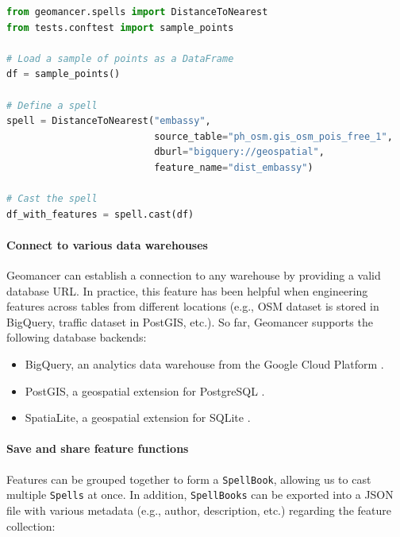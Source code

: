 \documentclass{article}
\begin{document}
\begin{lstlisting}[language=Python]
from geomancer.spells import DistanceToNearest
from tests.conftest import sample_points

# Load a sample of points as a DataFrame
df = sample_points()

# Define a spell
spell = DistanceToNearest("embassy",
                          source_table="ph_osm.gis_osm_pois_free_1",
                          dburl="bigquery://geospatial",
                          feature_name="dist_embassy")

# Cast the spell
df_with_features = spell.cast(df)
\end{lstlisting}

\paragraph{Connect to various data warehouses}
Geomancer can establish a connection to any warehouse by providing a valid
database URL. In practice, this feature has been helpful when engineering
features across tables from different locations (e.g., OSM dataset is stored in
BigQuery, traffic dataset in PostGIS, etc.). So far, Geomancer supports the
following database backends:

\begin{itemize}
    \item BigQuery, an analytics data warehouse from the Google Cloud
        Platform \cite{google2012bigquery, melnik2010dremel}.
    \item PostGIS, a geospatial extension for PostgreSQL
        \cite{stonebraker1987postgres, stonebraker1986design}.
    \item SpatiaLite, a geospatial extension for SQLite \cite{bhosale2015sqlite,
        spatialite}.
\end{itemize}

\paragraph{Save and share feature functions}
Features can be grouped together to form a \texttt{SpellBook}, allowing us to
cast multiple \texttt{Spells} at once. In addition, \texttt{SpellBooks} can be
exported into a JSON file with various metadata (e.g., author, description,
etc.) regarding the feature collection:
\end{document}
